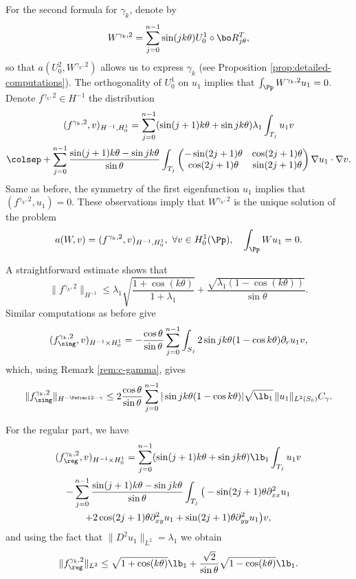 For the second formula for $\gamma_k$, denote by
\[
W^{\gamma_k,2} = \sum_{j=0}^{n-1} \sin(jk\theta) U_0^1\circ \bo R_{j\theta}^T,
\]
so that $a(U_0^2,W^{\gamma_k,2})$ allows us to express $\gamma_k$ (see Proposition \ref{prop:detailed-computations}). The orthogonality of $U_0^1$ on $u_1$ implies that $\int_\Pp W^{\gamma_k,2}u_1=0$. Denote $f^{\gamma_k,2} \in H^{-1}$ the distribution
\vspace*{-5pt}
\begin{multline*}
(f^{\gamma_k,2},v)_{H^{-1},H_0^1}
= \sum_{j=0}^{n-1} (\sin(j+1)k\theta+\sin jk\theta) \lambda_1\int_{T_j} u_1 v\\\colsep
+ \sum_{j=0}^{n-1} \frac{\sin(j+1)k\theta-\sin jk\theta}{\sin \theta} \int_{T_j}\begin{pmatrix}
-\sin (2j+1)\theta & \cos (2j+1) \theta \\
\cos(2j+1)\theta & \sin (2j+1)\theta
\end{pmatrix}\nabla u_1 \cdot \nabla v.
\end{multline*}
Same as before, the symmetry of the first eigenfunction $u_1$ implies that $(f^{\gamma_k,2},u_1) = 0$. These observations imply that $W^{\gamma_k,2}$ is the unique solution of the problem
\[
a(W,v) = (f^{\gamma_k,2},v)_{H^{-1},H_0^1},\ \forall v \in H_0^1(\Pp),\quad \int_\Pp Wu_1=0.
\]

A straightforward estimate shows that
\[
\|f^{\gamma_k,2}\|_{H^{-1}} \leq \lambda_1 \sqrt{\frac{1+\cos(k\theta)}{1+\lambda_1}} +\frac{\sqrt{\lambda_1(1-\cos(k\theta))}}{\sin \theta}.
\]
Similar computations as before give
\[
(f_{\sing}^{\gamma_k,2}, v)_{H^{-1}\times H^1_0} = - \frac{\cos \theta}{\sin \theta} \sum_{j=0}^{n-1}\int_{S_j} 2 \sin jk\theta(1-\cos k \theta) \partial_r u_1 v,
\]
which, using Remark \ref{rem:c-gamma}, gives
\[
\|f_{\sing}^{\gamma_k,2}\|_{H^{-\Psfrac 12-\gamma}}\le 2\frac{\cos \theta}{\sin \theta}\sum_{j=0}^{n-1} | \sin jk\theta(1-\cos k \theta)| \sqrt{\lb_1}\,\|u_1\|_{L^2(S_0)} C_\gamma.
\]

For the regular part, we have
\vspace*{-5pt}
\begin{multline*}
(f_{\reg}^{\gamma_k,2}, v)_{H^{-1}\times H^1_0}= \sum_{j=0}^{n-1} (\sin (j+1)k\theta+\sin jk\theta) \lb_1 \int_{T_j} u_1v \\
- \sum_{j=0}^{n-1} \frac{\sin(j+1)k\theta-\sin jk\theta}{\sin \theta} \int_{T_j} \big (-\sin (2j+1)\theta \partial^2_{xx}u_1\\
+2 \cos (2j+1)\theta \partial^2_{xy} u_1+ \sin(2j+1)\theta \partial^2_{yy} u_1\big)v,
\end{multline*}
and using the fact that $\|D^2 u_1\|_{L^2} = \lambda_1$ we obtain
\[
\|f_{\reg}^{\gamma_k,2}\|_{L^2}\le \sqrt{1+\cos (k \theta)} \lb_1 +\frac{\sqrt{2}}{\sin \theta} \sqrt{1- \cos (k \theta)}\lb_1 .
\]

